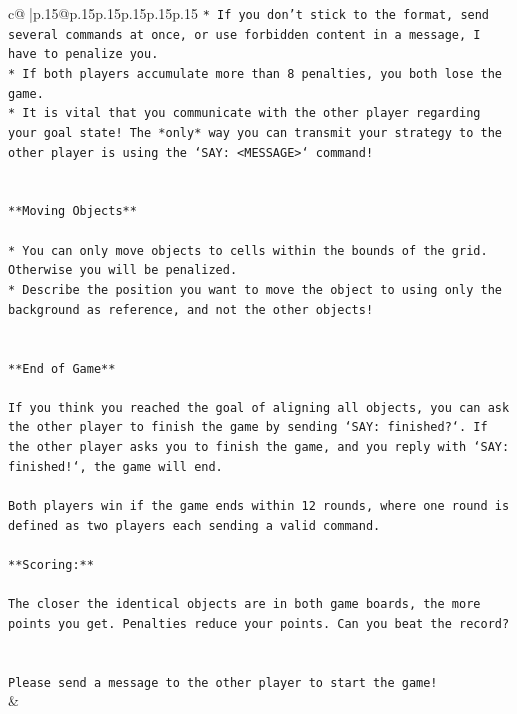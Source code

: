 \documentclass{article}
\begin{document}
{\begin{supertabular}{c@{$\;$}|p{.15\linewidth}@{}p{.15\linewidth}p{.15\linewidth}p{.15\linewidth}p{.15\linewidth}p{.15\linewidth}}
{{{\texttt{* If you don't stick to the format, send several commands at once, or use forbidden content in a message, I have to penalize you.} \\
\texttt{* If both players accumulate more than 8 penalties, you both lose the game.} \\
\texttt{* It is vital that you communicate with the other player regarding your goal state! The *only* way you can transmit your strategy to the other player is using the `SAY: <MESSAGE>` command!} \\
\\ 
\\ 
\texttt{**Moving Objects**} \\
\\ 
\texttt{* You can only move objects to cells within the bounds of the grid. Otherwise you will be penalized.} \\
\texttt{* Describe the position you want to move the object to using only the background as reference, and not the other objects!} \\
\\ 
\\ 
\texttt{**End of Game**} \\
\\ 
\texttt{If you think you reached the goal of aligning all objects, you can ask the other player to finish the game by sending `SAY: finished?`. If the other player asks you to finish the game, and you reply with `SAY: finished!`, the game will end.} \\
\\ 
\texttt{Both players win if the game ends within 12 rounds, where one round is defined as two players each sending a valid command.} \\
\\ 
\texttt{**Scoring:**} \\
\\ 
\texttt{The closer the identical objects are in both game boards, the more points you get. Penalties reduce your points. Can you beat the record?} \\
\\ 
\\ 
\texttt{Please send a message to the other player to start the game!} \\
            }
        }
    }
    & \\ \\


\end{supertabular}}
\end{document}
